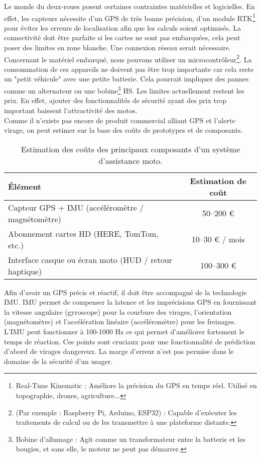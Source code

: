 Le monde du deux-roues posent certaines contraintes matérielles et logicielles. En effet, les capteurs nécessite d’un GPS de très bonne précision, d'un module RTK\footnote{Real-Time Kinematic : Améliore la précision du GPS en temps réel. Utilisé en topographie, drones, agriculture...} pour éviter les erreurs de localisation afin que les calculs soient optimisés. La connectivité doit être parfaite si les cartes ne sont pas embarquées, cela peut poser des limites en zone blanche. Une connexion réseau serait nécessaire. Concernant le matériel embarqué, nous pouvons utiliser un  microcontrôleur\footnote{ (Par exemple : Raspberry Pi, Arduino, ESP32) : Capable d’exécuter les traitements de calcul ou de les transmettre à une plateforme distante.}. La consommation de ces appareils ne doivent pas être trop importante car cela reste un "petit véhicule" avec une petite batterie. Cela pourrait impliquer des pannes comme un alternateur ou une bobine\footnote{Bobine d’allumage : Agit comme un transformateur entre la batterie et les bougies, et sans elle, le moteur ne peut pas démarrer.} HS.
Les limites actuellement restent les prix. En effet, ajouter des fonctionnalités de sécurité ayant des prix trop important baissent l'attractivité des motos. \\
Comme il n’existe pas encore de produit commercial alliant GPS et l'alerte virage, on peut estimer sur la base des coûts de prototypes et de composants.

\begin{table}[h!]
\centering
\begin{tabular}{|p{7cm}|c|}
\hline
\textbf{Élément} & \textbf{Estimation de coût} \\
\hline
Capteur GPS + IMU (accéléromètre / magnétomètre) & 50–200 € \\
Abonnement cartes HD (HERE, TomTom, etc.) & 10–30 € / mois \\
Interface casque ou écran moto (HUD / retour haptique) & 100–300 € \\
\hline
\end{tabular}
\caption{Estimation des coûts des principaux composants d'un système d’assistance moto.}
\label{tab:couts-composants}
\end{table}
Afin d'avoir un GPS précis et réactif, il doit être accompagné de la technologie IMU. IMU permet de compenser la latence et les imprécisions GPS en fournissant la vitesse angulaire (gyroscope) pour la courbure des virages, l'orientation (magnétomètre) et l'accélération linéaire (accéléromètre) pour les freinages. L'IMU peut fonctionner à 100-1000 Hz ce qui permet d'améliorer fortement le temps de réaction. Ces points sont cruciaux pour une fonctionnalité de prédiction d'abord de virages dangereux. La marge d'erreur n'est pas permise dans le domaine de la sécurité d'un usager.

